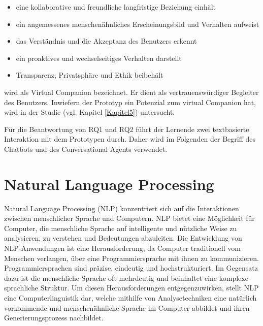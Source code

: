         \begin{minipage}[t]{0.5\textwidth}
        \begin{itemize}
            \item eine kollaborative und freundliche langfristige Beziehung einhält
            \item ein angemessenes menschenähnliches Erscheinungsbild und Verhalten aufweist
            \item das Verständnis und die Akzeptanz des Benutzers erkennt\\
      \end{itemize}
        \end{minipage}
        \hfill
        \begin{minipage}[t]{0.5\textwidth}
            \begin{itemize}
            \item ein proaktives und wechselseitiges Verhalten darstellt
            \item Transparenz, Privatsphäre und Ethik beibehält
        \end{itemize}
    \end{minipage}
        wird als Virtual Companion bezeichnet. Er dient als vertrauenswürdiger Begleiter des Benutzers. \parencite[140]{strohmann.2021}
        Inwiefern der Prototyp ein Potenzial zum virtual Companion hat, wird in der Studie (vgl. Kapitel \ref{Kapitel5}) untersucht.

        Für die Beantwortung von RQ1 und RQ2 führt der Lernende zwei textbasierte Interaktion mit dem Prototypen durch. Daher wird im Folgenden der Begriff des Chatbots und des Conversational Agents verwendet.
        \section{Natural Language Processing } \label{NLP}
        Natural Language Processing (NLP) konzentriert sich auf die Interaktionen zwischen menschlicher Sprache und Computern. NLP 
        bietet eine Möglichkeit für Computer, die menschliche Sprache auf intelligente und nützliche Weise zu analysieren,
        zu verstehen und Bedeutungen abzuleiten. 
        Die Entwicklung von NLP-Anwendungen ist eine Herausforderung, da Computer traditionell vom Menschen verlangen,
        über eine Programmiersprache mit ihnen zu kommunizieren.
        Programmiersprachen sind präzise, eindeutig und hochstrukturiert.
        Im Gegensatz dazu ist die menschliche Sprache oft mehrdeutig und beinhaltet eine komplexe sprachliche Struktur.
        Um diesen Herausforderungen entgegenzuwirken, stellt NLP eine Computerlinguistik dar,
        welche mithilfe von Analysetechniken eine natürlich vorkommende und menschenähnliche Sprache im Computer abbildet 
        und ihren Generierungsprozess nachbildet. \parencite[42]{Sieber.2019}\parencite[2]{Liddy.2001} 
        
